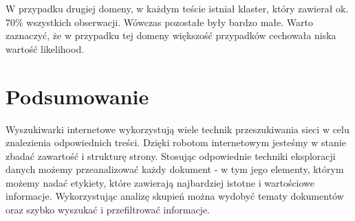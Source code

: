 \documentclass{classrep}
\begin{document}
    
    W przypadku drugiej domeny, w każdym teście istniał klaster, który zawierał ok. 70\% wszystkich obserwacji. Wówczas pozostałe były bardzo małe. 
    Warto zaznaczyć, że w przypadku tej domeny większość przypadków cechowała niska wartość likelihood.

    \section{Podsumowanie}
    
    Wyszukiwarki internetowe wykorzystują wiele technik przeszukiwania sieci w celu znalezienia odpowiednich treści. Dzięki robotom internetowym jesteśmy w stanie zbadać zawartość i strukturę strony. Stosując odpowiednie techniki eksploracji danych możemy przeanalizować każdy dokument - w tym jego elementy, którym możemy nadać etykiety, które zawierają najbardziej istotne i wartościowe informacje. Wykorzystując analizę skupień można wydobyć tematy dokumentów oraz szybko wyszukać i przefiltrować informacje.
\end{document}
